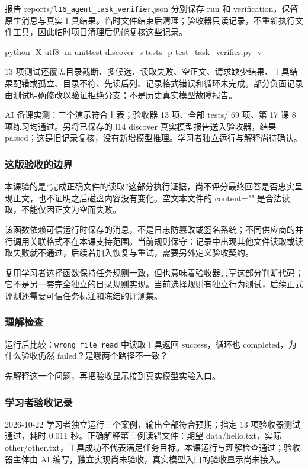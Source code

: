 \documentclass[UTF8,zihao=-4,fontset=fandol]{ctexart}
\begin{document}
报告 reports/\nolinkurl{l16_agent_task_verifier}.json 分别保存 run 和 verification，保留原生消息与真实工具结果。临时文件结束后清理；验收器只读记录，不重新执行文件工具，因此临时项目清理后仍能复核这些记录。

\begin{Code}
python -X utf8 -m unittest discover -s tests -p test_task_verifier.py -v
\end{Code}

13 项测试还覆盖目录截断、多候选、读取失败、空正文、请求缺少结果、工具结果配错或孤立、目录不符、先读后列、记录格式错误和循环未完成。部分负面记录由测试明确修改以验证拒绝分支；不是历史真实模型故障报告。

AI 备课实测：三个演示符合上表；验收器 13 项、全部 tests/ 69 项、第 17 课 8 项练习均通过。另将已保存的 l14 discover 真实模型报告送入验收器，结果 passed；这是旧记录复核，没有新增模型推理。学习者独立运行与解释尚待确认。

\subsubsection{这版验收的边界}

本课验的是“完成正确文件的读取”这部分执行证据，尚不评分最终回答是否忠实呈现正文，也不证明之后磁盘内容没有变化。空文本文件的 content="" 是合法读取，不能仅因正文为空而失败。

该函数依赖可信运行时保存的消息，不是日志防篡改或签名系统；不同供应商的并行调用关联格式不在本课支持范围。当前规则保守：记录中出现其他文件读取或读取失败就不通过，后续若加入恢复与重试，需要另外定义验收契约。

复用学习者选择函数保持任务规则一致，但也意味着验收器共享这部分判断代码；它不是另一套完全独立的目录规则实现。当前选择规则有独立行为测试，后续正式评测还需要可信任务标注和冻结的评测集。

\subsubsection{理解检查}

运行后比较：\nolinkurl{wrong_file_read} 中读取工具返回 success，循环也 completed，为什么验收仍然 failed？是哪两个路径不一致？

先解释这一个问题，再把验收显示接到真实模型实验入口。

\subsubsection{学习者验收记录}

2026-10-22 学习者独立运行三个案例，输出全部符合预期；指定 13 项验收器测试通过，耗时 0.011 秒。正确解释第三例读错文件：期望 data/hello.txt，实际 other/other.txt，工具成功不代表满足任务目标。本课运行与理解检查通过；验收器主体由 AI 编写，独立实现尚未验收，真实模型入口的验收显示尚未接入。
\end{document}
